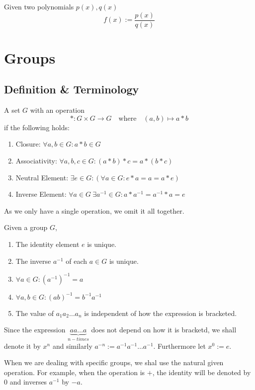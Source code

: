 \begin{definition}
   Given two polynomials \(p(x), q(x)\)
   \[f(x) := \frac{p(x)}{q(x)}\]
\end{definition}

\newpage

\section{Groups}
\subsection{Definition \& Terminology}
\begin{definition}[Group]
   A set \(G\) with an operation
   \[\ast: G \times G \to G \quad\text{where}\quad (a, b) \mapsto a \ast b\]
   if the following holds:
   \begin{enumerate}[label=\roman*, align=Center]
      \item Closure: \(\forall a, b \in G: a \ast b \in G\)
      \item Associativity: \(\forall a, b, c \in G: (a \ast b) \ast c = a \ast (b \ast c)\)
      \item Neutral Element: \(\exists e \in G: (\forall a \in G: e \ast a = a = a \ast e)\)
      \item Inverse Element: \(\forall a \in G~\exists a^{-1} \in G: a \ast a^{-1} = a^{-1} \ast a = e\)
   \end{enumerate}
\end{definition}
\begin{remark}[Notation]
   As we only have a single operation, we omit it all together.
\end{remark}

\begin{proposition}
   Given a group \(G\),
   \begin{enumerate}[label=\roman*, align=Center]
      \item The identity element \(e\) is unique.
      \item The inverse \(a^{-1}\) of each \(a \in G\) is unique.
      \item \(\forall a \in G: (a^{-1})^{-1} = a\)
      \item \(\forall a, b \in G: (ab)^{-1} = b^{-1}a^{-1}\)
      \item The value of \(a_1a_2\ldots a_n\) is independent of how the expression is bracketed.
   \end{enumerate}
\end{proposition}
\begin{remark}[Notation]
   Since the expression \(\underbrace{a a \ldots a}_{n-times}\) does not depend on how it is bracketd, we shall denote it by \(x^n\) and similarly \(a^{-n} := a^{-1} a^{-1} \ldots a^{-1}\).
   Furthermore let \(x^0 := e\).

   When we are dealing with specific groups, we shal use the natural given operation.
   For example, when the operation is \(+\), the identity will be denoted by 0 and inverses \(a^{-1}\) by \(-a\).
\end{remark}

